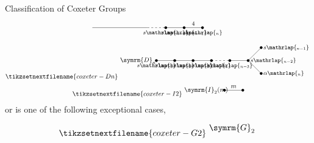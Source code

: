 \documentclass[fleqn]{NotesClass}
\newcommand{\dynkin}[2]{\symrm{#1}_{#2}}
\begin{document}
\begin{thm}{Classification of Coxeter Groups}{}
\begin{gather}
\begin{tikzpicture}[font=\small]
                \draw (0, 0) -- (3, 0);
                \draw [dashed] (3, 0) -- ++ (1, 0);
                \fill (4, 0) circle [radius=0.075cm] node [below] {\(s\mathrlap{_{n-2}}\)};
                \fill (5, 0) circle [radius=0.075cm] node [below] {\(s\mathrlap{_{n-1}}\)};
                \fill (6, 0) circle [radius=0.075cm] node [below] {\(s\mathrlap{_n}\)};
                \draw (4, 0) -- (6, 0) node [pos=0.75, above] {\(4\)};
            \end{tikzpicture}
            \\
            \tikzsetnextfilename{coxeter-Dn}
            \begin{tikzpicture}[font=\small]
                \node at (-1, 0) {\normalsize\(\dynkin{D}{n}\)};
                \fill (0, 0) circle [radius=0.075cm] node [below] {\(s\mathrlap{_1}\)};
                \fill (1, 0) circle [radius=0.075cm] node [below] {\(s\mathrlap{_2}\)};
                \fill (2, 0) circle [radius=0.075cm] node [below] {\(s\mathrlap{_3}\)};
                \fill (3, 0) circle [radius=0.075cm] node [below] {\(s\mathrlap{_4}\)};
                \draw (0, 0) -- (3, 0);
                \draw [dashed] (3, 0) -- ++ (1, 0);
                \fill (4, 0) circle [radius=0.075cm] node [below] {\(s\mathrlap{_{n-3}}\)};
                \fill (5, 0) circle [radius=0.075cm] node [right] {\(s\mathrlap{_{n-2}}\)};
                \fill[xshift=5cm, shift={(45:1)}] coordinate (A) circle [radius=0.075cm] node [right] {\(s\mathrlap{_{n-1}}\)};
                \fill[xshift=5cm, shift={(-45:1)}] coordinate (B) circle [radius=0.075cm] node [right] {\(\alpha\mathrlap{_n}\)};
                \draw (4, 0) -- (5, 0);
                \draw (5, 0) -- (A);
                \draw (5, 0) -- (B);
            \end{tikzpicture}
            \\
            \tikzsetnextfilename{coxeter-I2}
            \begin{tikzpicture}
                \node at (-1, 0) {\(\dynkin{I}{2}(m)\)};
                \fill (0, 0) circle [radius=0.075cm];
                \fill (1, 0) circle [radius=0.075cm];
                \draw (0, 0) -- (1, 0) node [midway, above] {\(m\)};
            \end{tikzpicture}
        \end{gather}
        or is one of the following exceptional cases,
        \begin{gather}
            \tikzsetnextfilename{coxeter-G2}
            \begin{tikzpicture}
                \node at (-1, 0) {\(\dynkin{G}{2}\)};

\end{tikzpicture}
\end{gather}
\end{thm}
\end{document}

